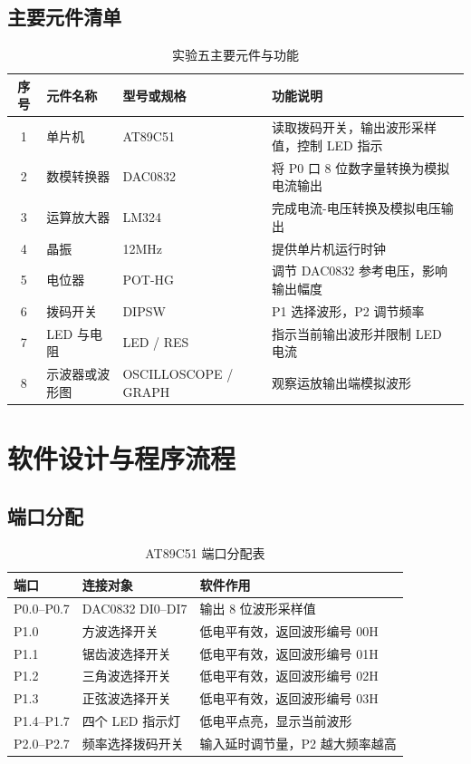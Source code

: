 \subsection{主要元件清单}
\begin{table}[H]
  \centering
  \caption{实验五主要元件与功能}
  \small
  \renewcommand{\arraystretch}{1.3}
  \begin{tabular}{cp{}p{}p{}}
    \toprule
    序号 & 元件名称 & 型号或规格 & 功能说明 \\
    \midrule
    1 & 单片机 & AT89C51 & 读取拨码开关，输出波形采样值，控制 LED 指示 \\
    2 & 数模转换器 & DAC0832 & 将 P0 口 8 位数字量转换为模拟电流输出 \\
    3 & 运算放大器 & LM324 & 完成电流-电压转换及模拟电压输出 \\
    4 & 晶振 & 12MHz & 提供单片机运行时钟 \\
    5 & 电位器 & POT-HG & 调节 DAC0832 参考电压，影响输出幅度 \\
    6 & 拨码开关 & DIPSW & P1 选择波形，P2 调节频率 \\
    7 & LED 与电阻 & LED / RES & 指示当前输出波形并限制 LED 电流 \\
    8 & 示波器或波形图 & OSCILLOSCOPE / GRAPH & 观察运放输出端模拟波形 \\
    \bottomrule
  \end{tabular}
\end{table}

\section{软件设计与程序流程}

\subsection{端口分配}
\begin{table}[H]
  \centering
  \caption{AT89C51 端口分配表}
  \renewcommand{\arraystretch}{1.35}
  \begin{tabular}{p{}p{}p{}}
    \toprule
    端口 & 连接对象 & 软件作用 \\
    \midrule
    P0.0--P0.7 & DAC0832 DI0--DI7 & 输出 8 位波形采样值 \\
    P1.0 & 方波选择开关 & 低电平有效，返回波形编号 00H \\
    P1.1 & 锯齿波选择开关 & 低电平有效，返回波形编号 01H \\
    P1.2 & 三角波选择开关 & 低电平有效，返回波形编号 02H \\
    P1.3 & 正弦波选择开关 & 低电平有效，返回波形编号 03H \\
    P1.4--P1.7 & 四个 LED 指示灯 & 低电平点亮，显示当前波形 \\
    P2.0--P2.7 & 频率选择拨码开关 & 输入延时调节量，P2 越大频率越高 \\
    \bottomrule
  \end{tabular}
\end{table}


